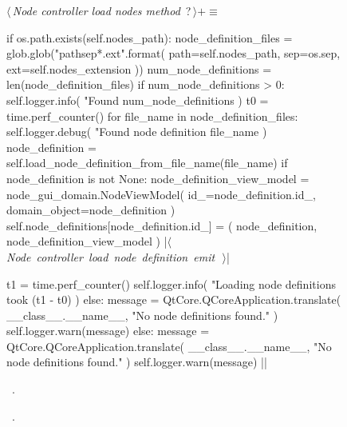 \documentclass[%
    a4paper,    %
    justified,  %
    nobib,      %
    openany     %
]{tufte-book}
\makeatletter
\renewcommand{\label}[1]{\@tufte@label{##1}}%
\makeatother
\begin{document}
\begin{figure}
\begin{flushleft} \small
\begin{minipage}{\linewidth}\label{scrap123}\raggedright\small
{} $\langle\,${\itshape Node controller load nodes method}\nobreak\ {\footnotesize {?}}$\,\rangle+\equiv$
\vspace{-1ex}
\begin{pythoncode}

if os.path.exists(self.nodes_path):
    node_definition_files = glob.glob("{path}{sep}*.{ext}".format(
        path=self.nodes_path,
        sep=os.sep,
        ext=self.nodes_extension
    ))
    num_node_definitions = len(node_definition_files)
    if num_node_definitions > 0:
        self.logger.info(
            "Found %
            num_node_definitions
        )
        t0 = time.perf_counter()
        for file_name in node_definition_files:
            self.logger.debug(
                "Found node definition %
                file_name
            )
            node_definition = self.load_node_definition_from_file_name(file_name)
            if node_definition is not None:
                node_definition_view_model = node_gui_domain.NodeViewModel(
                    id_=node_definition.id_,
                    domain_object=node_definition
                )
                self.node_definitions[node_definition.id_] = (
                    node_definition,
                    node_definition_view_model
                )
                |\hbox{$\langle\,${\itshape Node controller load node definition emit}\nobreak\ {\footnotesize {}}$\,\rangle$}|

        t1 = time.perf_counter()
        self.logger.info(
            "Loading node definitions took %
            (t1 - t0)
        )
    else:
        message = QtCore.QCoreApplication.translate(
            __class__.__name__, "No node definitions found."
        )
        self.logger.warn(message)
else:
    message = QtCore.QCoreApplication.translate(
        __class__.__name__, "No node definitions found."
    )
    self.logger.warn(message)
|\NWsep|
\end{pythoncode}
\vspace{1.5ex}
\footnotesize
\begin{list}{}{\setlength{\itemsep}{-\parsep}\setlength{\itemindent}{-\leftmargin}}
\item \NWtxtMacroDefBy\ .
\item \NWtxtMacroRefIn\ .


\end{list}
\end{minipage}
\end{flushleft}
\end{figure}
\end{document}
